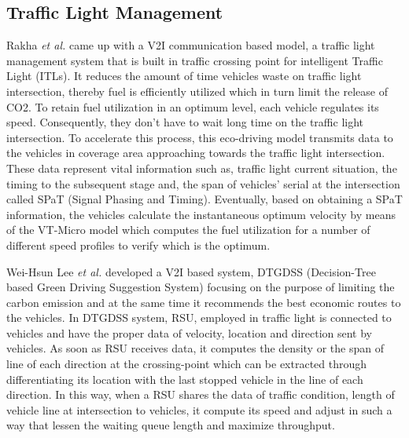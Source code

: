 \documentclass[conference]{IEEEtran}
\begin{document}
\subsection{Traffic Light Management}
Rakha \textit{et al.} \cite{rakha2011eco} came up with a V2I communication based model, a traffic light management system that is built in traffic crossing point for  intelligent Traffic Light (ITLs). It reduces the amount of time vehicles waste on traffic light intersection, thereby fuel is efficiently utilized which in turn limit the release of CO2. To  retain fuel  utilization in an  optimum level, each  vehicle  regulates  its  speed. Consequently, they don't have to wait long time on the traffic light intersection. To accelerate this process, this eco-driving model transmits data to the  vehicles in coverage  area  approaching towards the traffic light intersection. These data represent vital information such as, traffic  light current situation,  the  timing  to  the subsequent stage and,  the span  of  vehicles’ serial  at  the intersection  called  SPaT  (Signal  Phasing  and  Timing). Eventually, based on obtaining a SPaT information, the vehicles calculate the instantaneous  optimum velocity by means of the VT-Micro model which computes the fuel utilization  for  a number of  different  speed  profiles to verify which is the optimum.

Wei-Hsun Lee \textit{et al.} \cite{lee2012decision} developed a V2I based system, DTGDSS (Decision-Tree  based  Green  Driving  Suggestion  System) focusing on the purpose of limiting the carbon emission and at the same time it recommends the best economic routes to the vehicles. In DTGDSS system, RSU, employed in traffic light is connected to vehicles and have the proper data of velocity, location and direction sent by vehicles. As soon as RSU receives data, it computes the density or the span of line of each direction at the crossing-point which can be extracted through differentiating its location with the last stopped vehicle in the line of each direction. In this way, when a RSU shares the data of traffic condition, length of vehicle line at intersection to vehicles, it compute its speed and adjust in such a way that lessen the waiting queue length and maximize throughput.
\end{document}
